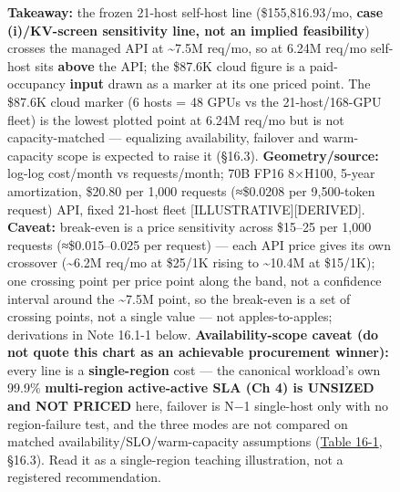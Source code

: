 \begin{figure}
\caption[\textbf{Takeaway:} the frozen 21-host self-host line]{\textbf{Takeaway:} the frozen 21-host self-host line (\$155,816.93/mo, \textbf{case (i)/KV-screen sensitivity line, not an implied feasibility}) crosses the managed API at \textasciitilde7.5M req/mo, so at 6.24M req/mo self-host sits \textbf{above} the API; the \$87.6K cloud figure is a paid-occupancy \textbf{input} drawn as a marker at its one priced point. The \$87.6K cloud marker (6 hosts = 48 GPUs vs the 21-host/168-GPU fleet) is the lowest plotted point at 6.24M req/mo but is not capacity-matched --- equalizing availability, failover and warm-capacity scope is expected to raise it (§16.3). \textbf{Geometry/source:} log-log cost/month vs requests/month; 70B FP16 8×H100, 5-year amortization, \$20.80 per 1,000 requests (≈\$0.0208 per 9,500-token request) API, fixed 21-host fleet \mbox{{[}ILLUSTRATIVE{]}}\hspace{0pt}\mbox{{[}DERIVED{]}}. \textbf{Caveat:} break-even is a price sensitivity across \$15--25 per 1,000 requests (≈\$0.015--0.025 per request) --- each API price gives its own crossover (\textasciitilde6.2M req/mo at \$25/1K rising to \textasciitilde10.4M at \$15/1K); one crossing point per price point along the band, not a confidence interval around the \textasciitilde7.5M point, so the break-even is a set of crossing points, not a single value --- not apples-to-apples; derivations in Note 16.1-1 below. \textbf{Availability-scope caveat (do not quote this chart as an achievable procurement winner):} every line is a \textbf{single-region} cost --- the canonical workload's own 99.9\% \textbf{multi-region active-active SLA (Ch 4) is UNSIZED and NOT PRICED} here, failover is N−1 single-host only with no region-failure test, and the three modes are not compared on matched availability/SLO/warm-capacity assumptions (\hyperref[tab:16.1]{Table 16-1}, §16.3). Read it as a single-region teaching illustration, not a registered recommendation.}

\label{fig:16.1}\end{figure}
